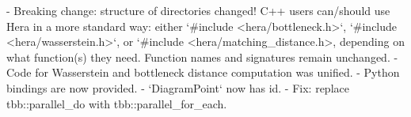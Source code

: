 \label{md_ext_2hera_2_c_h_a_n_g_e_l_o_g_autotoc_md0}%
%
 \begin{DoxyVerb}- Breaking change: structure of directories changed!  C++ users can/should use Hera in a more standard way: either `#include <hera/bottleneck.h>`, `#include <hera/wasserstein.h>`, or `#include <hera/matching_distance.h>, depending on what function(s) they need. Function names and signatures remain unchanged.
- Code for Wasserstein and bottleneck distance computation was unified.
- Python bindings are now provided.
- `DiagramPoint` now has id.
- Fix: replace tbb::parallel_do with tbb::parallel_for_each.
\end{DoxyVerb}
 